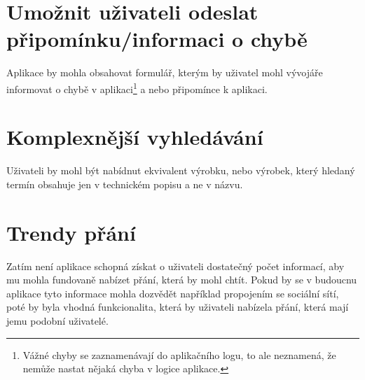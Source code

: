 \section{Umožnit uživateli odeslat připomínku/informaci o chybě}
Aplikace by mohla obsahovat formulář, kterým by uživatel mohl vývojáře informovat o chybě v aplikaci\footnote{Vážné chyby se zaznamenávají do aplikačního logu, to ale neznamená, že nemůže nastat nějaká chyba v logice aplikace.} a nebo připomínce k aplikaci.

\section{Komplexnější vyhledávání}
Uživateli by mohl být nabídnut ekvivalent výrobku, nebo výrobek, který hledaný termín obsahuje jen v technickém popisu a ne v názvu.

\section{Trendy přání}
Zatím není aplikace schopná získat o uživateli dostatečný počet informací, aby mu mohla fundovaně nabízet přání, která by mohl chtít. Pokud by se v budoucnu aplikace tyto informace mohla dozvědět například propojením se sociální sítí, poté by byla vhodná funkcionalita, která by uživateli nabízela přání, která mají jemu podobní uživatelé.